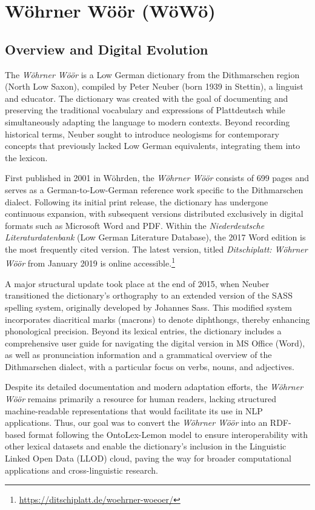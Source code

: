 \section{Wöhrner Wöör (WöWö)}

\subsection{Overview and Digital Evolution}

The \emph{Wöhrner Wöör} is a Low German dictionary from the Dithmarschen region (North Low Saxon), compiled by Peter Neuber (born 1939 in Stettin), a linguist and educator. The dictionary was created with the goal of documenting and preserving the traditional vocabulary and expressions of Plattdeutsch while simultaneously adapting the language to modern contexts. Beyond recording historical terms, Neuber sought to introduce neologisms for contemporary concepts that previously lacked Low German equivalents, integrating them into the lexicon.

First published in 2001 in Wöhrden, the \emph{Wöhrner Wöör} consists of 699 pages and serves as a German-to-Low-German reference work specific to the Dithmarschen dialect. Following its initial print release, the dictionary has undergone continuous expansion, with subsequent versions distributed exclusively in digital formats such as Microsoft Word and PDF. Within the \emph{Niederdeutsche Literaturdatenbank} (Low German Literature Database), the 2017 Word edition is the most frequently cited version. The latest version, titled \emph{Ditschiplatt: Wöhrner Wöör} from January 2019 is online accessible.\footnote{\url{https://ditschiplatt.de/woehrner-woeoer/}}

A major structural update took place at the end of 2015, when Neuber transitioned the dictionary's orthography to an extended version of the SASS spelling system, originally developed by Johannes Sass. This modified system incorporates diacritical marks (macrons) to denote diphthongs, thereby enhancing phonological precision. Beyond its lexical entries, the dictionary includes a comprehensive user guide for navigating the digital version in MS Office (Word), as well as pronunciation information and a grammatical overview of the Dithmarschen dialect, with a particular focus on verbs, nouns, and adjectives.

Despite its detailed documentation and modern adaptation efforts, the \emph{Wöhrner Wöör} remains primarily a resource for human readers, lacking structured machine-readable representations that would facilitate its use in NLP applications. Thus, our goal was to convert the \emph{Wöhrner Wöör} into an RDF-based format following the OntoLex-Lemon model to ensure interoperability with other lexical datasets and enable the dictionary’s inclusion in the Linguistic Linked Open Data (LLOD) cloud, paving the way for broader computational applications and cross-linguistic research.

